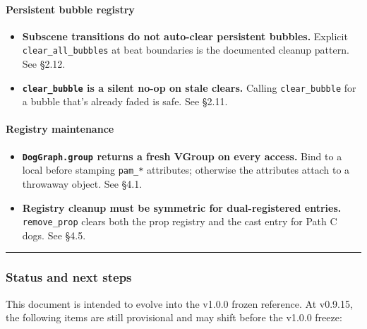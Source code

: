 \documentclass[
  12pt,
  letterpaper,
]{book}
\providecommand{\tightlist}{%
  \setlength{\itemsep}{0pt}\setlength{\parskip}{0pt}}
\begin{document}
\paragraph{Persistent bubble registry}\label{persistent-bubble-registry}

\begin{itemize}
\tightlist
\item
  \textbf{Subscene transitions do not auto-clear persistent bubbles.}
  Explicit \texttt{clear\_all\_bubbles} at beat boundaries is the
  documented cleanup pattern. See §2.12.
\item
  \textbf{\texttt{clear\_bubble} is a silent no-op on stale clears.}
  Calling \texttt{clear\_bubble} for a bubble that's already faded is
  safe. See §2.11.
\end{itemize}

\paragraph{Registry maintenance}\label{registry-maintenance}

\begin{itemize}
\tightlist
\item
  \textbf{\texttt{DogGraph.group} returns a fresh VGroup on every
  access.} Bind to a local before stamping \texttt{pam\_*} attributes;
  otherwise the attributes attach to a throwaway object. See §4.1.
\item
  \textbf{Registry cleanup must be symmetric for dual-registered
  entries.} \texttt{remove\_prop} clears both the prop registry and the
  cast entry for Path C dogs. See §4.5.
\end{itemize}

\begin{center}\rule{0.5\linewidth}{0.5pt}\end{center}

\subsubsection{Status and next steps}\label{status-and-next-steps}

This document is intended to evolve into the v1.0.0 frozen reference. At
v0.9.15, the following items are still provisional and may shift before
the v1.0.0 freeze:
\end{document}
